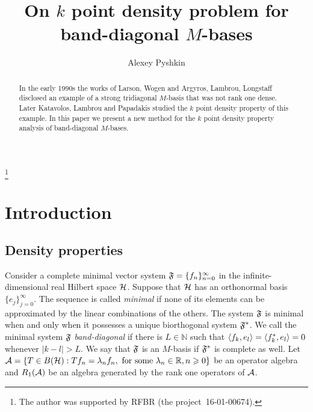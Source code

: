 \documentclass[12pt]{amsart}
\theoremstyle{case}
\begin{document}
\title{On $k$ point density problem for band-diagonal $M$-bases}
\author{Alexey Pyshkin}
\begin{abstract}
  In the early 1990s the works of Larson, Wogen and Argyros, Lambrou, Longstaff
    disclosed an example of a strong tridiagonal $M$-basis that was not rank one dense.
  Later Katavolos, Lambrou and Papadakis studied the $k$ point density property of this example.
  In this paper we present a new method for the $k$ point density property analysis of band-diagonal
    $M$-bases.
\end{abstract}
\thanks{The author was supported by RFBR (the project~16-01-00674).}
\maketitle

\section{Introduction}
  \subsection{Density properties}
    Consider a complete minimal vector system $\fsys = \seq{f}$ in the infinite-dimensional real Hilbert space $\cal{H}$.
    Suppose that $\cal{H}$ has an orthonormal basis $\{e_j\}_{j=0}^\infty$.
    The sequence is called \emph{minimal} if none of its elements can be approximated by the linear combinations of the others.
    The system $\fsys$ is minimal when and only when it possesses a unique biorthogonal system $\fstarsys$.
    We call the minimal system $\fsys$ \emph{band-diagonal} if there is $L \in \mathbb{N}$ such that $\inner{f_k}{e_l} = \inner{f^*_k}{e_l} = 0$
      whenever $\lvert k - l \rvert > L$.
    We say that $\fsys$ is an $M$-basis if $\fstarsys$ is complete as well.
    Let ${\cal{A} = \{T\in B(\cal{H}): Tf_n = \lambda_n f_n,  \text{ for some } \lambda_n \in \mathbb{R}, n \geq 0\}}$ be an operator algebra
      and $R_1(\cal{A})$ be an algebra generated by the rank one operators of $\cal{A}$.
\end{document}
